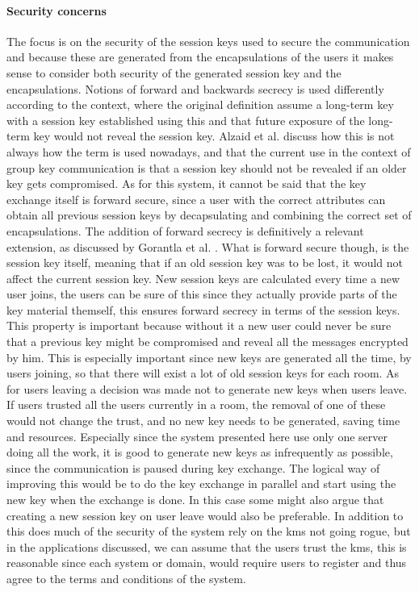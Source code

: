 \paragraph{Security concerns}
The focus is on the security of the session keys used to secure the communication and because these are generated from the encapsulations of the users it makes sense to consider both security of the generated session key and the encapsulations. Notions of forward and backwards secrecy is used differently according to the context, where the original definition assume a long-term key with a session key established using this and that future exposure of the long-term key would not reveal the session key. Alzaid et al. \cite{Alzaid2010} discuss how this is not always how the term is used nowadays, and that the current use in the context of group key communication is that a session key should not be revealed if an older key gets compromised. As for this system, it cannot be said that the key exchange itself is forward secure, since a user with the correct attributes can obtain all previous session keys by decapsulating and combining the correct set of encapsulations. The addition of forward secrecy is definitively a relevant extension, as discussed by Gorantla et al. \cite{gorantla2010attribute}. What is forward secure though, is the session key itself, meaning that if an old session key was to be lost, it would not affect the current session key. New session keys are calculated every time a new user joins, the users can be sure of this since they actually provide parts of the key material themself, this ensures forward secrecy in terms of the session keys. This property is important because without it a new user could never be sure that a previous key might be compromised and reveal all the messages encrypted by him. This is especially important since new keys are generated all the time, by users joining, so that there will exist a lot of old session keys for each room. As for users leaving a decision was made not to generate new keys when users leave. If users trusted all the users currently in a room, the removal of one of these would not change the trust, and no new key needs to be generated, saving time and resources. Especially since the system presented here use only one server doing all the work, it is good to generate new keys as infrequently as possible, since the communication is paused during key exchange. The logical way of improving this would be to do the key exchange in parallel and start using the new key when the exchange is done. In this case some might also argue that creating a new session key on user leave would also be preferable.
In addition to this does much of the security of the system rely on the \gls{kms} not going rogue, but in the applications discussed, we can assume that the users trust the \gls{kms}, this is reasonable since each system or domain, would require users to register and thus agree to the terms and conditions of the system.



